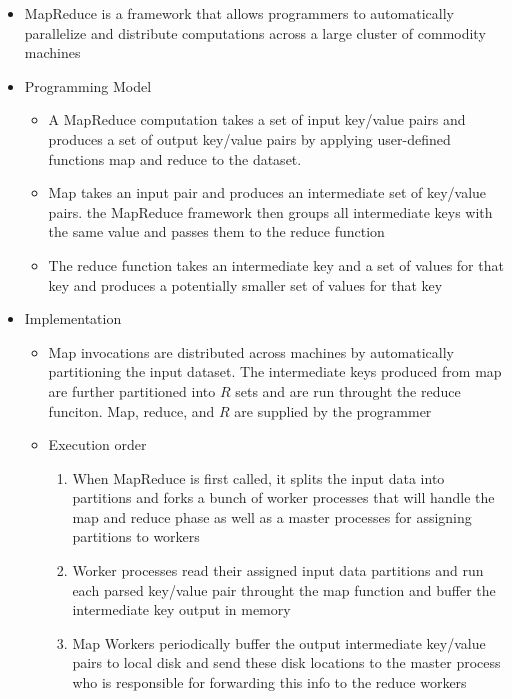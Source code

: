\documentclass[a4paper]{article}
\begin{document}
\begin{itemize}
\item MapReduce is a framework that allows programmers to automatically parallelize and distribute computations across a large cluster of commodity machines

\item Programming Model
\begin{itemize}
\item A MapReduce computation takes a set of input key/value pairs and produces a set of output key/value pairs by applying user-defined functions map and reduce to the dataset.

\item Map takes an input pair and produces an intermediate set of key/value pairs. the MapReduce framework then groups all intermediate keys with the same value and passes them to the reduce function

\item The reduce function takes an intermediate key and a set of values for that key and produces a potentially smaller set of values for that key
\end{itemize}

\item Implementation
\begin{itemize}
\item Map invocations are distributed across machines by automatically partitioning the input dataset. The intermediate keys produced from map are further partitioned into $R$ sets and are run throught the reduce funciton. Map, reduce, and $R$ are supplied by the programmer

\item Execution order
\begin{enumerate}
\item When MapReduce is first called, it splits the input data into partitions and forks a bunch of worker processes that will handle the map and reduce phase as well as a master processes for assigning partitions to workers

\item Worker processes read their assigned input data partitions and run each parsed key/value pair throught the map function and buffer the intermediate key output in memory

\item Map Workers periodically buffer the output intermediate key/value pairs to local disk and send these disk locations to the master process who is responsible for forwarding this info to the reduce workers


\end{enumerate}
\end{itemize}
\end{itemize}
\end{document}
